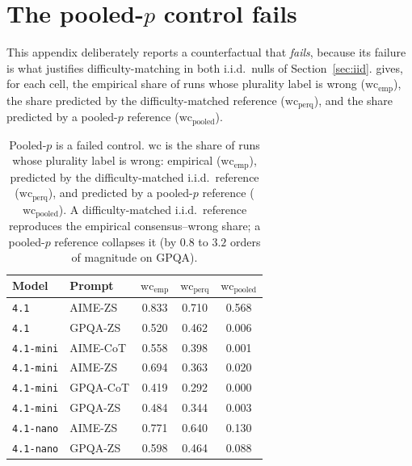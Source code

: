 \documentclass[a4paper,fleqn]{cas-sc}
\begin{document}
\printcredits{}




\clearpage
\appendix

\section{The pooled-$p$ control fails}
\label{app:pooled}

This appendix deliberately reports a counterfactual that \emph{fails}, because its
failure is what justifies difficulty-matching in both i.i.d.\ nulls of
Section~\ref{sec:iid}.  gives, for each
cell, the empirical share of runs whose plurality label is wrong
($\mathrm{wc}_{\mathrm{emp}}$), the share predicted by the
difficulty-matched reference ($\mathrm{wc}_{\mathrm{perq}}$), and the
share predicted by a pooled-$p$ reference
($\mathrm{wc}_{\mathrm{pooled}}$).

\begin{table}[t]\begin{minipage}{\linewidth}
\centering
\caption{Pooled-$p$ is a failed control. $\mathrm{wc}$ is the share of runs whose plurality label is wrong: empirical ($\mathrm{wc}_{\mathrm{emp}}$), predicted by the difficulty-matched i.i.d.\ reference ($\mathrm{wc}_{\mathrm{perq}}$), and predicted by a pooled-$p$ reference ($\mathrm{wc}_{\mathrm{pooled}}$). A difficulty-matched i.i.d.\
reference reproduces the empirical consensus--wrong share; a pooled-$p$
reference collapses it (by $0.8$ to $3.2$ orders of magnitude on GPQA).}
\label{tab:pooled}
\begin{tabular}{llccc}
\toprule
Model & Prompt & $\mathrm{wc}_{\mathrm{emp}}$ &
$\mathrm{wc}_{\mathrm{perq}}$ & $\mathrm{wc}_{\mathrm{pooled}}$ \\
\midrule
\texttt{4.1} & AIME-ZS & 0.833 & 0.710 & 0.568 \\
\texttt{4.1} & GPQA-ZS & 0.520 & 0.462 & 0.006 \\
\texttt{4.1-mini} & AIME-CoT & 0.558 & 0.398 & 0.001 \\
\texttt{4.1-mini} & AIME-ZS & 0.694 & 0.363 & 0.020 \\
\texttt{4.1-mini} & GPQA-CoT & 0.419 & 0.292 & 0.000 \\
\texttt{4.1-mini} & GPQA-ZS & 0.484 & 0.344 & 0.003 \\
\texttt{4.1-nano} & AIME-ZS & 0.771 & 0.640 & 0.130 \\
\texttt{4.1-nano} & GPQA-ZS & 0.598 & 0.464 & 0.088 \\
\bottomrule
\end{tabular}
\end{minipage}\end{table}
\end{document}
